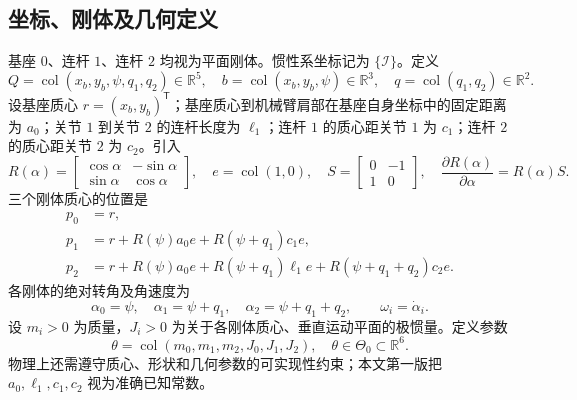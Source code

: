 \documentclass[journal,onecolumn]{IEEEtran}
\newcommand{\R}{\mathbb R}
\newcommand{\tr}{\mathsf T}
\newcommand{\col}{\operatorname{col}}
\begin{document}
\subsection{坐标、刚体及几何定义}
基座 $0$、连杆 $1$、连杆 $2$ 均视为平面刚体。惯性系坐标记为 $\{\mathcal I\}$。定义
\begin{equation}
 Q=\col(x_b,y_b,\psi,q_1,q_2)\in\R^5,\quad
 b=\col(x_b,y_b,\psi)\in\R^3,\quad q=\col(q_1,q_2)\in\R^2.
 \label{eq:Q}
\end{equation}
设基座质心 $r=(x_b,y_b)^\tr$；基座质心到机械臂肩部在基座自身坐标中的固定距离为 $a_0$；关节 $1$ 到关节 $2$ 的连杆长度为 $\ell_1$；连杆 $1$ 的质心距关节 $1$ 为 $c_1$；连杆 $2$ 的质心距关节 $2$ 为 $c_2$。引入
\begin{equation}
 R(\alpha)=\begin{bmatrix}\cos\alpha&-\sin\alpha\\\sin\alpha&\cos\alpha\end{bmatrix},\quad
 e=\col(1,0),\quad S=\begin{bmatrix}0&-1\\1&0\end{bmatrix},\quad
 \frac{\partial R(\alpha)}{\partial\alpha}=R(\alpha)S.
\end{equation}
三个刚体质心的位置是
\begin{align}
 p_0 &= r,\label{eq:p0}\\
 p_1 &= r+R(\psi)a_0e+R(\psi+q_1)c_1e,\label{eq:p1}\\
 p_2 &= r+R(\psi)a_0e+R(\psi+q_1)\ell_1e+R(\psi+q_1+q_2)c_2e.\label{eq:p2}
\end{align}
各刚体的绝对转角及角速度为
\begin{equation}
 \alpha_0=\psi,\quad\alpha_1=\psi+q_1,\quad\alpha_2=\psi+q_1+q_2,\qquad \omega_i=\dot\alpha_i.
\end{equation}
设 $m_i>0$ 为质量，$J_i>0$ 为关于各刚体质心、垂直运动平面的极惯量。定义参数
\begin{equation}
 \theta=\col(m_0,m_1,m_2,J_0,J_1,J_2),\quad \theta\in\Theta_0\subset\R^6.
\end{equation}
物理上还需遵守质心、形状和几何参数的可实现性约束；本文第一版把 $a_0,\ell_1,c_1,c_2$ 视为准确已知常数。
\end{document}
